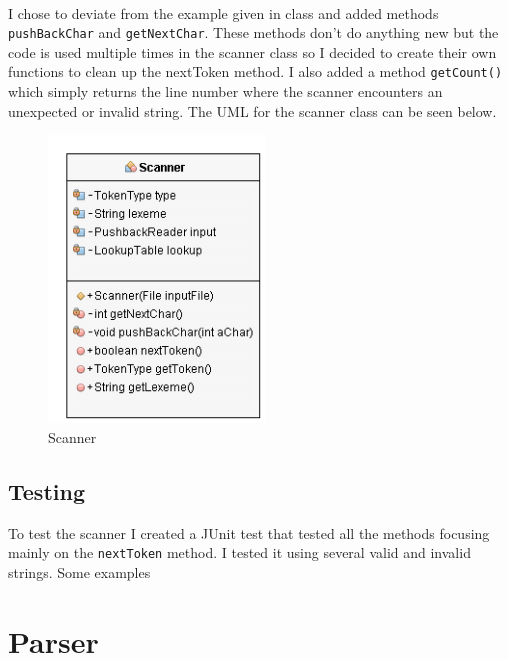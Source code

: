 \documentclass[10]{article}
\begin{document}
\paragraph{}
I chose to deviate from the example given in class and added methods \verb|pushBackChar| and \verb|getNextChar|. These methods don't do anything new but the code is used multiple times in the scanner class so I decided to create their own functions to clean up the nextToken method. I also added a method \verb|getCount()| which simply returns the line number where the scanner encounters an unexpected or invalid string. The UML for the scanner class can be seen below.

\begin{figure}[!ht]
	\includegraphics[height=3in]{ScannerUML.png}
	\caption{Scanner \label{fig: fg2}}
\end{figure}

\subsection{Testing}
To test the scanner I created a JUnit test that tested all the methods focusing mainly on the \verb|nextToken| method. I tested it using several valid and invalid strings. Some examples 

\section{Parser}
\end{document}
